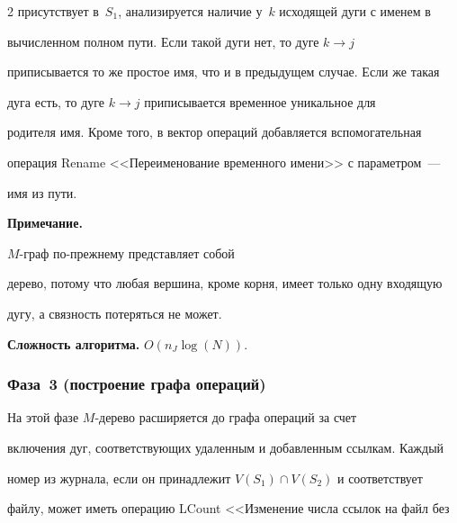 \begin{multicols}{2}
присутствует в~$S_1$, анализируется наличие у~$k$ исходящей дуги с именем в 


вычисленном полном пути. Если такой дуги нет, то дуге $k\rightarrow j$ 


приписывается то же простое имя, что и в предыдущем случае. Если же такая 


дуга есть, то дуге $k\rightarrow j$ приписывается временное уникальное для 


родителя имя. Кроме того, в вектор операций добавляется вспомогательная 


операция Rename <<Переименование временного имени>> с параметром~---  


имя из пути. 


      


      \smallskip





\noindent


{\sf \textbf{Примечание.} 


$M$-граф по-прежнему представляет собой 


дерево, потому что любая вершина, кроме корня, имеет только одну входящую 


дугу, а связность потеряться не может.}








      \smallskip


      


      \noindent


      \textbf{Сложность алгоритма.} $O(n_J \log (N))$.





\subsubsection{Фаза~3 (построение графа операций)}  %





      На этой фазе $M$-дерево расширяется до графа операций  за счет 


включения дуг, соответствующих удаленным и добавленным ссылкам. Каж\-дый 


номер из журнала, если он принадлежит $V(S_1)\cap V(S_2)$ и соответствует 


файлу, может иметь операцию LCount <<Изменение числа ссылок на файл без 



\end{multicols}

